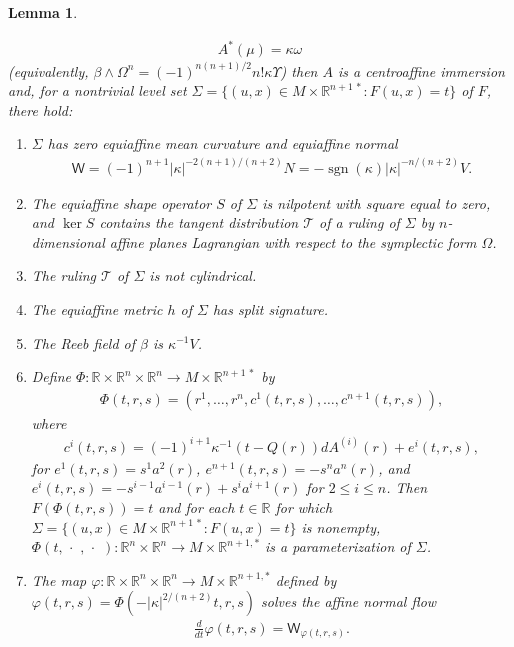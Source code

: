\documentclass [leqno, 10pt]{amsart}
\newtheorem{lemma}[theorem]{Lemma}
\theoremstyle{definition}
\numberwithin{equation}{section}
\newcommand{\Om}{\Omega}
\newcommand{\om}{\omega}
\newcommand{\ka}{\kappa}
\newcommand{\T}{\mathcal{T}}
\newcommand{\dum}{\,\cdot\,\,}
\newcommand{\nm}{\mathsf{W}}
\newcommand{\sign}{\operatorname{sgn}}
\newcommand{\be}{\beta}
\newcommand{\rea}{\mathbb R}
\begin{document}
\begin{lemma}
\begin{enumerate}
\begin{align}
A^{\ast}(\mu) = \ka \om
\end{align}
(equivalently, $\be \wedge \Om^{n} = (-1)^{n(n+1)/2}n! \ka \Upsilon$)
then $A$ is a centroaffine immersion and, for a nontrivial level set $\Sigma = \{(u, x) \in M \times \rea^{n+1\,\ast}: F(u, x) = t\}$ of $F$, there hold:
\begin{enumerate}
\item $\Sigma$ has zero equiaffine mean curvature and equiaffine normal
\begin{align}\label{wadak}
\nm = (-1)^{n+1}|\ka|^{-2(n+1)/(n+2)}N = -\sign(\ka)|\ka|^{-n/(n+2)}V.
\end{align}
\item The equiaffine shape operator $S$ of $\Sigma$ is nilpotent with square equal to zero, and $\ker S$ contains the tangent distribution $\T$ of a ruling of $\Sigma$ by $n$-dimensional affine planes Lagrangian with respect to the symplectic form $\Om$.
\item The ruling $\T$ of $\Sigma$ is not cylindrical.
\item The equiaffine metric $h$ of $\Sigma$ has split signature.
\item The Reeb field of $\be$ is $\ka^{-1}V$.
\item\label{param} 
Define $\Phi:\rea \times \rea^{n} \times \rea^{n} \to M \times \rea^{n+1\,\ast}$ by 
\begin{align}\label{levelparam}
\Phi(t, r, s) = (r^{1}, \dots, r^{n}, c^{1}(t, r, s), \dots, c^{n+1}(t, r, s)),
\end{align}
where
\begin{align}
c^{i}(t, r, s) = (-1)^{i+1}\ka^{-1}(t - Q(r))dA^{(i)}(r) + e^{i}(t, r, s),
\end{align}
for $e^{1}(t, r, s) = s^{1}a^{2}(r)$, $e^{n+1}(t, r, s) = -s^{n}a^{n}(r)$, and $e^{i}(t, r, s) = -s^{i-1}a^{i-1}(r) + s^{i}a^{i+1}(r)$ for $2\leq i \leq n$. Then $F(\Phi(t, r, s)) = t$ and for each $t \in \rea$ for which $\Sigma =  \{(u, x) \in M \times \rea^{n+1\,\ast}: F(u, x) = t\}$ is nonempty, $\Phi(t, \dum, \dum): \rea^{n} \times \rea^{n} \to M \times \rea^{n+1,\ast}$ is a parameterization of $\Sigma$.
\item The map $\varphi:\rea \times \rea^{n} \times \rea^{n} \to M \times \rea^{n+1,\ast}$ defined by $\varphi(t, r, s) = \Phi(-|\ka|^{2/(n+2)}t, r, s)$ solves the affine normal flow
\begin{align}\label{mcflow}
\tfrac{d}{dt}\varphi(t, r, s) = \nm_{\varphi(t, r, s)}.
\end{align}
\end{enumerate}
\end{enumerate}
\end{lemma}
\end{document}
